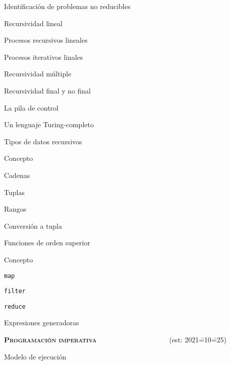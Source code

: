 \begin{longenum}
\begin{longenum}
\begin{longenum}
\begin{longenum}
\begin{longenum}
                    \item Identificación de problemas no reducibles
                \end{longenum}
                \item Recursividad lineal
                \begin{longenum}
                    \item Procesos recursivos lineales
                    \item Procesos iterativos linales
                \end{longenum}
                \item Recursividad múltiple
                \item Recursividad final y no final
            \end{longenum}
            \item La pila de control
            \item Un lenguaje Turing-completo
        \end{longenum}
        \item Tipos de datos recursivos
        \begin{longenum}
            \item Concepto
            \item Cadenas
            \item Tuplas
            \item Rangos
            \item Conversión a tupla
        \end{longenum}
        \item Funciones de orden superior
        \begin{longenum}
            \item Concepto
            \item \texttt{map}
            \item \texttt{filter}
            \item \texttt{reduce}
            \item Expresiones generadoras
        \end{longenum}
    \end{longenum}
    \item \textbf{\textsc{Programación imperativa}} \ \ \ \ \ \ \ \ \ \ \ \ \ \ \ \ \ \ \ \ (est: 2021\==10\==25)
    \begin{longenum}
        \item Modelo de ejecución

\end{longenum}
\end{longenum}
